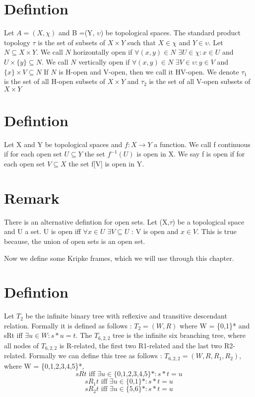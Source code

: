 \documentclass[12pt, a4paper]{scrreprt}
\begin{document}
\section{Defintion}
Let $A = (X, \chi)$ and B =(Y, $\upsilon$) be topological spaces. The standard product topology $\tau$ is the set of subsets of 
$X \times Y$ such that $X \in \chi$ and $Y \in \upsilon$. \newline
Let $N \subseteq X \times Y $. We call $N$ horizontally open if $\forall (x,y) \in N $ $\exists U \in \chi : x \in U $ and $ U \times \{ y \} \subseteq N$. \newline We call $N$ 
vertically open if $\forall (x,y) \in N$ $\exists V \in \upsilon : y \in V$ and  $ \{ x \} \times V \subseteq N$ \newline
If $N$ is H-open and V-open, then we call it HV-open. \newline
We denote $\tau_1$ is the set of all H-open subsets of $X \times Y$ and $\tau_2$ is the set of all V-open subsets of $X\times Y$

\section{Defintion}
Let X and Y be topological spaces and $f : X \rightarrow Y$ a function.
We call f continuous if for each open set $U \subseteq Y$ the set $f^{-1}(U)$ is open in X. We say f 
is open if for each open set $V \subseteq X$ the set f[V] is open in Y.

\section{Remark}
There is an alternative defintion for open sets. Let (X,$\tau$) be a topological space and U a set.
U is open iff $\forall x \in U$  $\exists V\subseteq U$ : V is open and $x \in V$. This is true because,
the union of open sets is an open set.
\newline
\newline

Now we define some Kripke frames, which we will use through this chapter.

\section{Defintion}
Let $T_2$ be the infinite binary tree with reflexive and transitive descendant relation. \newline Formally it is defined as follows :
$T_2 = (W,R)$ where W = \{0,1\}* and sRt iff $\exists u\in W : s*u = t$. \newline
The $T_ {6,2,2}$ tree is the infinite six branching tree, where all nodes of $T_ {6,2,2}$ is R-related, the first two R1-related 
and the last two R2-related. Formally we can define this tree as follows : $T_ {6,2,2} = (W,R,R_1,R_2)$,
where W = \{{0,1,2,3,4,5}\}*, $$sRt \mbox{ iff } \exists u \in \mbox{\{0,1,2,3,4,5\}*} : s*t = u $$
$$ sR_1t  \mbox{ iff } \exists u \in \mbox{\{0,1\}*} : s*t = u$$
$$ sR_2t  \mbox{ iff } \exists u \in \mbox{\{5,6\}*} : s*t = u$$
\end{document}
